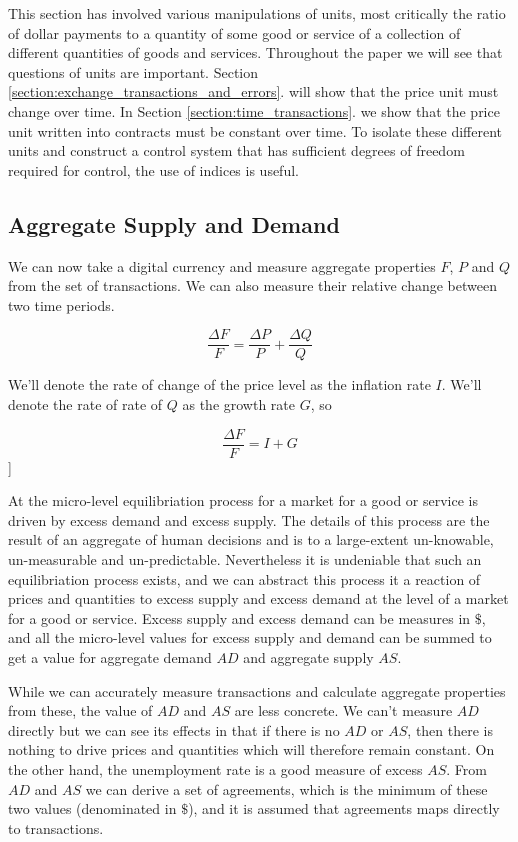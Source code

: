 This section has involved various manipulations of units, most critically the ratio of dollar
payments to a quantity of some good or service of a collection of different quantities of goods and
services. Throughout the paper we will see that questions of units are important. Section
\ref{section:exchange_transactions_and_errors}. will show that the price unit must change over
time. In Section \ref{section:time_transactions}. we show that the price unit written into
contracts must be constant over time. To isolate these different units and construct a control
system that has sufficient degrees of freedom required for control, the use of indices is useful.

\subsection{Aggregate Supply and Demand}
\label{section:aggregate_supply_and_demand}

We can now take a digital currency and measure aggregate properties $F$, $P$ and $Q$ from the set of
transactions. We can also measure their relative change between two time periods.

\[
    \frac {\Delta F} F = \frac {\Delta P} P + \frac {\Delta Q} Q
\]

We'll denote the rate of change of the price level as the inflation rate $I$. We'll denote the rate
of rate of $Q$ as the growth rate $G$, so

\begin{equation}
    \label{equation:fig}
    \frac {\Delta F} F = I + G
\end{equation}]

At the micro-level equilibriation process for a market for a good or service is driven by excess
demand and excess supply. The details of this process are the result of an aggregate of human
decisions and is to a large-extent un-knowable, un-measurable and un-predictable. Nevertheless it is
undeniable that such an equilibriation process exists, and we can abstract this process it a
reaction of prices and quantities to excess supply and excess demand at the level of a market for a
good or service. Excess supply and excess demand can be measures in $\$$, and all the micro-level
values for excess supply and demand can be summed to get a value for aggregate demand $AD$ and
aggregate supply $AS$.  

While we can accurately measure transactions and calculate aggregate properties from these, the
value of $AD$ and $AS$ are less concrete. We can't measure $AD$ directly but we can see its effects
in that if there is no $AD$ or $AS$, then there is nothing to drive prices and quantities which will
therefore remain constant. On the other hand, the unemployment rate is a good measure of excess
$AS$. From $AD$ and $AS$ we can derive a set of agreements, which is the minimum of these two values
(denominated in $\$$), and it is assumed that agreements maps directly to transactions.

